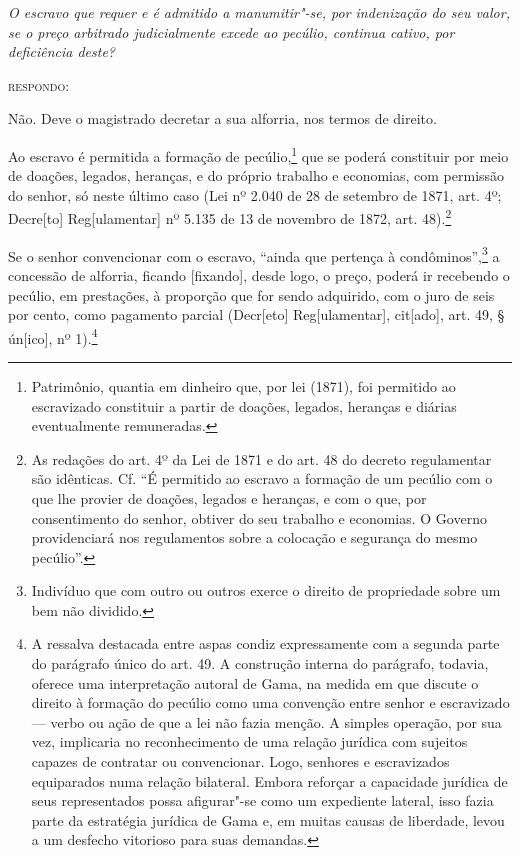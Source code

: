 \noindent\emph{O escravo que requer e é admitido a
manumitir"-se, por indenização do seu valor, se o preço arbitrado
judicialmente excede ao pecúlio, continua cativo, por deficiência
deste?}

\textsc{respondo:}

Não. Deve o magistrado decretar a sua alforria, nos termos de direito.

\asterisc

Ao escravo é permitida a formação de pecúlio,\footnote{Patrimônio,
  quantia em dinheiro que, por lei (1871), foi permitido ao escravizado
  constituir a partir de doações, legados, heranças e diárias
  eventualmente remuneradas.} que se poderá constituir por meio de
doações, legados, heranças, e do próprio trabalho e economias, com
permissão do senhor, só neste último caso (Lei nº 2.040 de 28 de
setembro de 1871, art. 4º; Decre{[}to{]} Reg{[}ulamentar{]} nº 5.135 de
13 de novembro de 1872, art. 48).\footnote{As redações do art. 4º da
  Lei de 1871 e do art. 48 do decreto regulamentar são idênticas. Cf. ``É
  permitido ao escravo a formação de um pecúlio com o que lhe provier de
  doações, legados e heranças, e com o que, por consentimento do senhor,
  obtiver do seu trabalho e economias. O Governo providenciará nos
  regulamentos sobre a colocação e segurança do mesmo pecúlio''.}

Se o senhor convencionar com o escravo, ``ainda que pertença à
condôminos'',\footnote{Indivíduo que com outro ou outros exerce o
  direito de propriedade sobre um bem não dividido.} a concessão de
alforria, ficando {[}fixando{]}, desde logo, o preço, poderá ir
recebendo o pecúlio, em prestações, à proporção que for sendo adquirido,
com o juro de seis por cento, como pagamento parcial (Decr{[}eto{]}
Reg{[}ulamentar{]}, cit{[}ado{]}, art. 49, § ún{[}ico{]}, nº
1).\footnote{A ressalva destacada entre aspas condiz expressamente com
  a segunda parte do parágrafo único do art. 49. A construção interna do
  parágrafo, todavia, oferece uma interpretação autoral de Gama,
  na medida em que discute o direito à formação do pecúlio como uma
  convenção entre senhor e escravizado --- verbo ou ação de que a lei não
  fazia menção. A simples operação, por sua vez, implicaria no
  reconhecimento de uma relação jurídica com sujeitos capazes de
  contratar ou convencionar. Logo, senhores e escravizados equiparados
  numa relação bilateral. Embora reforçar a capacidade jurídica de seus
  representados possa afigurar"-se como um expediente lateral, isso fazia
  parte da estratégia jurídica de Gama e, em muitas causas de liberdade,
  levou a um desfecho vitorioso para suas demandas.}

